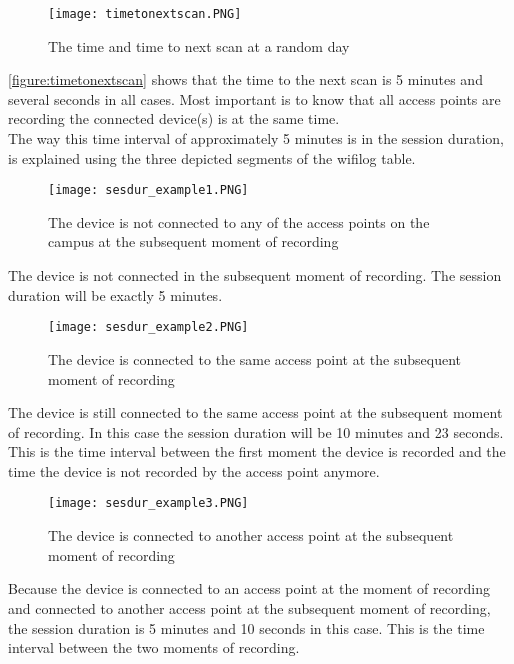 \begin{figure}[H]
	\centering
	\texttt{[image: timetonextscan.PNG]}
	\captionsetup{justification=centering}
	\caption{The time and time to next scan at a random day}
	\label{figure:timetonextscan}
\end{figure}

\autoref{figure:timetonextscan} shows that the time to the next scan is 5 minutes and several seconds in all cases. Most important is to know that all access points are recording the connected device(s) is at the same time. 
\\
The way this time interval of approximately 5 minutes is in the session duration, is explained using the three depicted segments of the wifilog table.

\begin{figure}[H]
	\centering
	\texttt{[image: sesdur\_example1.PNG]}
	\captionsetup{justification=centering}
	\caption{The device is not connected to any of the access points on the campus at the subsequent moment of recording}
	\label{sesdur_example1}
\end{figure}
The device is not connected in the subsequent moment of recording. The session duration will be exactly 5 minutes.
\\
\begin{figure}[H]
	\centering
	\texttt{[image: sesdur\_example2.PNG]}
	\captionsetup{justification=centering}
	\caption{The device is connected to the same access point at the subsequent moment of recording}
	\label{sesdur_example2}
\end{figure}
The device is still connected to the same access point at the subsequent moment of recording. In this case the session duration will be 10 minutes and 23 seconds. This is the time interval between the first moment the device is recorded and the time the device is not recorded by the access point anymore.
\\
\begin{figure}[H]
	\centering
	\texttt{[image: sesdur\_example3.PNG]}
	\captionsetup{justification=centering}
	\caption{The device is connected to another access point at the subsequent moment of recording}
	\label{sesdur_exampl3e}
\end{figure}
Because the device is connected to an access point at the moment of recording and connected to another access point at the subsequent moment of recording, the session duration is 5 minutes and 10 seconds in this case. This is the time interval between the two moments of recording.



